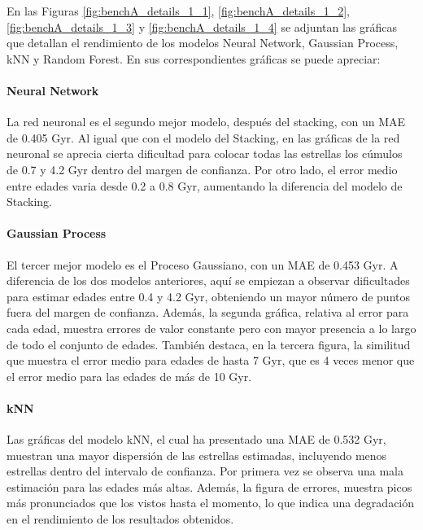 En las Figuras \ref{fig:benchA_details_1_1}, \ref{fig:benchA_details_1_2}, \ref{fig:benchA_details_1_3} y \ref{fig:benchA_details_1_4} se adjuntan las gráficas que detallan el rendimiento de los modelos Neural Network, Gaussian Process, kNN y Random Forest. En sus correspondientes gráficas se puede apreciar:

\paragraph{Neural Network} 
La red neuronal es el segundo mejor modelo, después del stacking, con un MAE de 0.405 Gyr. Al igual que con el modelo del Stacking, en las gráficas de la red neuronal se aprecia cierta dificultad para colocar todas las estrellas los cúmulos de 0.7 y 4.2 Gyr dentro del margen de confianza. Por otro lado, el error medio entre edades varia desde 0.2 a 0.8 Gyr, aumentando la diferencia del modelo de Stacking.

\paragraph{Gaussian Process} 
El tercer mejor modelo es el Proceso Gaussiano, con un MAE de 0.453 Gyr. A diferencia de los dos modelos anteriores, aquí se empiezan a observar dificultades para estimar edades entre 0.4 y 4.2 Gyr, obteniendo un mayor número de puntos fuera del margen de confianza. Además, la segunda gráfica, relativa al error para cada edad, muestra errores de valor constante pero con mayor presencia a lo largo de todo el conjunto de edades. También destaca, en la tercera figura, la similitud que muestra el error medio para edades de hasta 7 Gyr, que es 4 veces menor que el error medio para las edades de más de 10 Gyr.

\paragraph{kNN} 
Las gráficas del modelo kNN, el cual ha presentado una MAE de 0.532 Gyr, muestran una mayor dispersión de las estrellas estimadas, incluyendo menos estrellas dentro del intervalo de confianza. Por primera vez se observa una mala estimación para las edades más altas. Además, la figura de errores, muestra picos más pronunciados que los vistos hasta el momento, lo que indica una degradación en el rendimiento de los resultados obtenidos.

